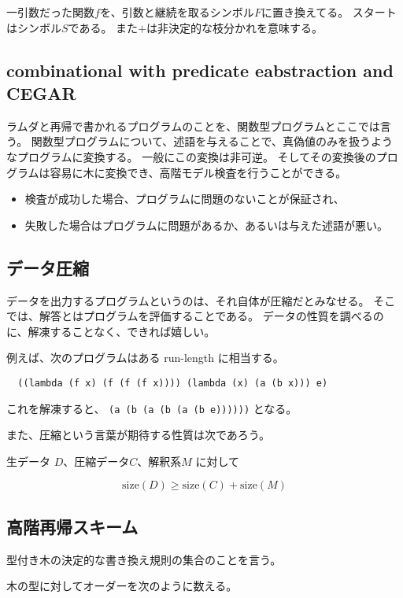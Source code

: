 \documentclass[]{jsarticle}
\begin{document}
一引数だった関数$f$を、引数と継続を取るシンボル$F$に置き換えてる。
スタートはシンボル$S$である。
また$+$は非決定的な枝分かれを意味する。

\subsection{combinational with predicate eabstraction and CEGAR}

ラムダと再帰で書かれるプログラムのことを、関数型プログラムとここでは言う。
関数型プログラムについて、述語を与えることで、真偽値のみを扱うようなプログラムに変換する。
一般にこの変換は非可逆。
そしてその変換後のプログラムは容易に木に変換でき、高階モデル検査を行うことができる。

\begin{itemize}
  \item 検査が成功した場合、プログラムに問題のないことが保証され、
  \item 失敗した場合はプログラムに問題があるか、あるいは与えた述語が悪い。
\end{itemize}

\subsection{データ圧縮}

データを出力するプログラムというのは、それ自体が圧縮だとみなせる。
そこでは、解答とはプログラムを評価することである。
データの性質を調べるのに、解凍することなく、できれば嬉しい。

例えば、次のプログラムはある run-length に相当する。

\begin{verbatim}
  ((lambda (f x) (f (f (f x)))) (lambda (x) (a (b x))) e)
\end{verbatim}

これを解凍すると、
\verb+(a (b (a (b (a (b e))))))+
となる。


また、圧縮という言葉が期待する性質は次であろう。

生データ $D$、圧縮データ$C$、解釈系$M$ に対して

\def\size{\text{size}}
\[ \size(D) \ge \size(C) + \size(M) \]

\subsection{高階再帰スキーム}

型付き木の決定的な書き換え規則の集合のことを言う。

木の型に対してオーダーを次のように数える。
\end{document}
